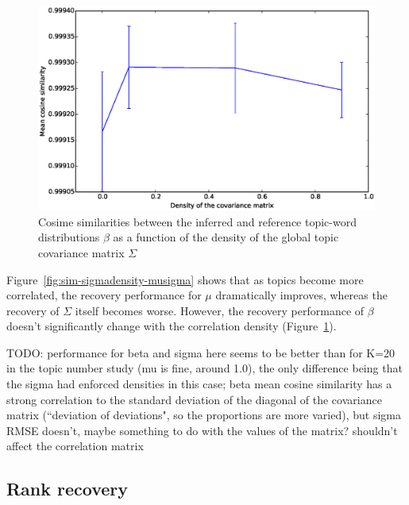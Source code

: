 \documentclass[12pt,a4paper,twoside,openright]{report}
\begin{document}
\begin{figure}[!htb]
\includegraphics[width=\textwidth]{sim-sigmadensity-beta.eps}
\caption{Cosime similarities between the inferred and reference topic-word distributions $\beta$ as a function of the density of the global topic covariance matrix $\Sigma$}
\label{fig:sim-sigmadensity-beta}
\end{figure}

Figure~\ref{fig:sim-sigmadensity-musigma} shows that as topics become more correlated, the recovery performance for $\mu$ dramatically improves, whereas the recovery of $\Sigma$ itself becomes worse. However, the recovery performance of $\beta$ doesn't significantly change with the correlation density (Figure~\ref{fig:sim-sigmadensity-beta}).

TODO: performance for beta and sigma here seems to be better than for K=20 in the topic number study (mu is fine, around 1.0), the only difference being that the sigma had enforced densities in this case; beta mean cosine similarity has a strong correlation to the standard deviation of the diagonal of the covariance matrix (``deviation of deviations", so the proportions are more varied), but sigma RMSE doesn't, maybe something to do with the values of the matrix? shouldn't affect the correlation matrix

\subsection{Rank recovery}
\end{document}
